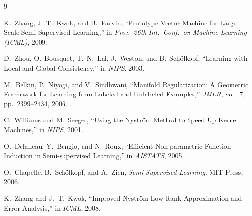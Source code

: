 \documentclass[10pt, conference]{IEEEtran}
\begin{document}
\begin{thebibliography}{9}

K.~Zhang, J.~T.~Kwok, and B.~Parvin, ``Prototype Vector Machine for Large Scale Semi-Supervised Learning,'' in \textit{Proc.\ 26th Int.\ Conf.\ on Machine Learning (ICML)}, 2009.

D.~Zhou, O.~Bousquet, T.~N.~Lal, J.~Weston, and B.~Sch\"{o}lkopf, ``Learning with Local and Global Consistency,'' in \textit{NIPS}, 2003.

M.~Belkin, P.~Niyogi, and V.~Sindhwani, ``Manifold Regularization: A Geometric Framework for Learning from Labeled and Unlabeled Examples,'' \textit{JMLR}, vol.~7, pp.~2399--2434, 2006.

C.~Williams and M.~Seeger, ``Using the Nystr\"{o}m Method to Speed Up Kernel Machines,'' in \textit{NIPS}, 2001.

O.~Delalleau, Y.~Bengio, and N.~Roux, ``Efficient Non-parametric Function Induction in Semi-supervised Learning,'' in \textit{AISTATS}, 2005.

O.~Chapelle, B.~Sch\"{o}lkopf, and A.~Zien, \textit{Semi-Supervised Learning}. MIT Press, 2006.

K.~Zhang and J.~T.~Kwok, ``Improved Nystr\"{o}m Low-Rank Approximation and Error Analysis,'' in \textit{ICML}, 2008.

\end{thebibliography}
\end{document}
